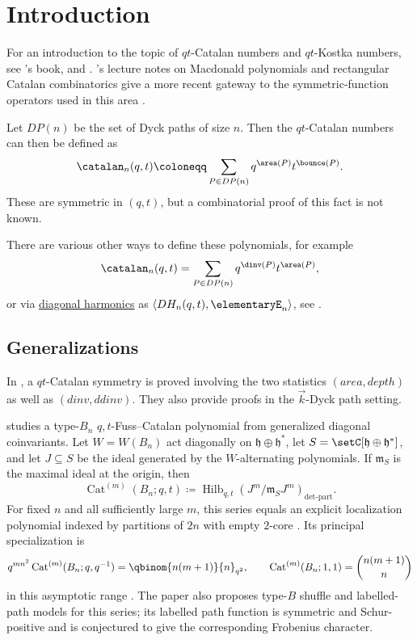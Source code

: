 



\section[qtCatalan]{Introduction}

For an introduction to the topic of $qt$-Catalan numbers and $qt$-Kostka numbers,
see 's book, \cite{qtCatalanBook} and  \cite{Bergeron2009}.
's lecture notes on Macdonald polynomials and
rectangular Catalan combinatorics give a more recent gateway to the
symmetric-function operators used in this area
\cite{Bergeron2021MacdonaldCatalan,Bergeron2021RectangularCatalan}.



Let $DP(n)$ be the set of Dyck paths of size $n$. 
Then the $qt$-Catalan numbers can then be defined as
\[
\catalan_n(q,t) \coloneqq \sum_{P \in DP(n)} q^{\area(P)} t^{\bounce(P)}.
\]
These are symmetric in $(q,t)$, but a combinatorial proof of this fact is not known.

There are various other ways to define these polynomials, for example
\[
\catalan_n(q,t) = \sum_{P \in DP(n)} q^{\dinv(P)} t^{\area(P)},
\]
or via \hyperref[diagonalHarmonics]{diagonal harmonics} as $\langle DH_n(q,t), \elementaryE_{n} \rangle$,
see \cite[Thm. I.2]{GarsiaHaglund2000}.



\subsection[qtCatalanGeneralizations]{Generalizations}

In \cite{QuZhang2025x}, a $qt$-Catalan symmetry is proved involving 
the two statistics $(area,depth)$ as well as $(dinv,ddinv)$.
They also provide proofs in the $\vec{k}$-Dyck path setting.

 studies a type-$B_n$ $q,t$-Fuss--Catalan polynomial
from generalized diagonal coinvariants.  Let $W=W(B_n)$ act diagonally on
$\mathfrak h\oplus\mathfrak h^*$, let
$S=\setC[\mathfrak h\oplus\mathfrak h^*]$, and let $J\subseteq S$ be the ideal
generated by the $W$-alternating polynomials.  If $\mathfrak m_S$ is the
maximal ideal at the origin, then
\[
\operatorname{Cat}^{(m)}(B_n;q,t)
\coloneqq
\operatorname{Hilb}_{q,t}
\left(J^m/\mathfrak m_SJ^m\right)_{\det\text{-part}}.
\]
For fixed $n$ and all sufficiently large $m$, this series equals an explicit
localization polynomial indexed by partitions of $2n$ with empty $2$-core
\cite[Thm.~9.4]{Oblomkov2026x}.  Its principal specialization is
\[
q^{mn^2}\operatorname{Cat}^{(m)}(B_n;q,q^{-1})
=\qbinom{n(m+1)}{n}_{q^2},
\qquad
\operatorname{Cat}^{(m)}(B_n;1,1)=\binom{n(m+1)}{n}
\]
in this asymptotic range \cite[Thm.~7.2]{Oblomkov2026x}.  The paper also
proposes type-$B$ shuffle and labelled-path models for this series; its
labelled path function is symmetric and Schur-positive and is conjectured to
give the corresponding Frobenius character.
